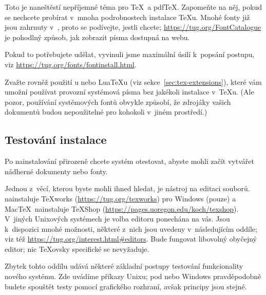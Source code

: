 \documentclass[\classoptions,slovak,english,czech]{\classname}
\begin{document}
Toto je naneštěstí nepříjemné téma pro \TeX\ a pdf\TeX. Zapomeňte na něj, 
pokud se nechcete probírat v~mnoha podrobnostech instalace \TeX u. Mnohé fonty již jsou zahrnuty v~\TL, proto
se podívejte, jestli chcete; \url{https://tug.org/FontCatalogue} je pohodlný
způsob, jak zobrazit písma dostupná na webu.

Pokud to potřebujete udělat, vyvinuli jsme maximální úsilí 
k~popsání postupu, viz \url{https://tug.org/fonts/fontinstall.html}.

Zvažte rovněž použití \XeTeX{}u nebo Lua\TeX{}u (viz
sekce~\ref{sec:tex-extensions}), které vám umožní používat provozní
systémová písma bez jakékoli instalace v~\TeX{}u. (Ale pozor, používání
systémových fontů obvykle způsobí, že zdrojáky vašich dokumentů budou nepoužitelné pro kohokoli v~jiném prostředí.) 

\subsection{Testování instalace}
\label{sec:test.install}

Po nainstalování \TL{} přirozeně chcete
systém otestovat, abyste mohli začít vytvářet nádherné dokumenty nebo fonty.

Jednou z~věcí, kterou byste mohli ihned hledat, je nástroj na editaci
souborů.  \TL{} nainstaluje \TeX{}works (\url{https://tug.org/texworks})
pro Windows (pouze) a Mac\TeX\ nainstaluje TeXShop
(\url{https://pages.uoregon.edu/koch/texshop}).  V~jiných Unixových systémech
je volba editoru ponechána na vás. Jsou k~dispozici mnohé možnosti, 
některé z~nich jsou uvedeny v~následujícím oddíle; viz
též \url{https://tug.org/interest.html#editors}. Bude fungovat libovolný
obyčejný editor; nic \TeX{}ovsky specifické se nevyžaduje.

Zbytek tohto oddílu udává některé základní postupy testování funkcionality
nového systému. Zde uvádíme příkazy Unixu; pod
\macOS{} nebo Windows pravděpodobně budete spouštět testy pomocí
grafického rozhraní, avšak principy jsou stejné.
\end{document}
